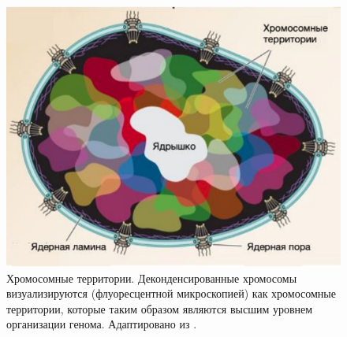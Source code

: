 \begin{figure} [H]
    \centering
    \includegraphics[width=\textwidth]{images/p6/p6_1_vved/p6_1_f2.1.pdf}
    \caption[Хромосомные территории.]{Хромосомные территории. Деконденсированные хромосомы визуализируются (флуоресцентной микроскопией) как хромосомные территории, которые таким образом являются высшим уровнем организации генома. Адаптировано из \cite{fraser_overview_2015}.}
    \label{fig:p6_1_f2.1}
\end{figure}
    
